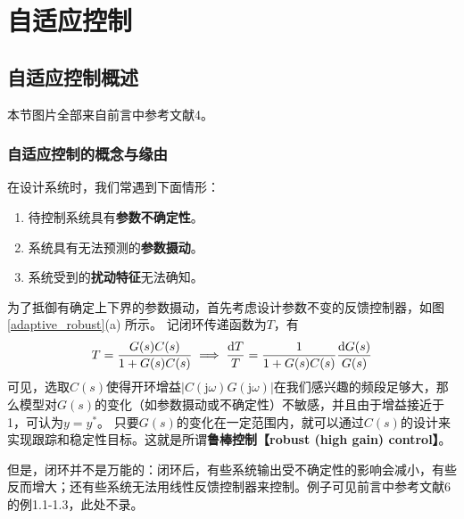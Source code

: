 \chapter{自适应控制}\label{cp4}
\section{自适应控制概述}\label{4Aref}
本节图片全部来自前言中参考文献4。
\subsection{自适应控制的概念与缘由}
在设计系统时，我们常遇到下面情形：
\begin{enumerate}
  \item 待控制系统具有{\textbf{参数不确定性}}。
  
  \item 系统具有无法预测的{\textbf{参数摄动}}。
  
  \item 系统受到的{\bf 扰动特征}无法确知。
\end{enumerate}

为了抵御有确定上下界的参数摄动，首先考虑设计参数不变的反馈控制器，如图 \ref{adaptive_robust}(a) 所示。
  记闭环传递函数为$T$，有\[T=\frac{G(s)C(s)}{1+G(s)C(s)}\implies \frac{\mathop{}\!\mathrm{d} T}{T}=\frac{1}{1+G(s)C(s)}\frac{\mathop{}\!\mathrm{d} G(s)}{G(s)}\]
  可见，选取$C(s)$使得开环增益$|C(\mathrm{j}\omega)G(\mathrm{j}\omega)|$在我们感兴趣的频段足够大，那么模型对$G(s)$的变化（如参数摄动或不确定性）不敏感，并且由于增益接近于1，可认为$y=y^\ast$。
  只要$G(s)$的变化在一定范围内，就可以通过$C(s)$的设计来实现跟踪和稳定性目标。这就是所谓{\bf 鲁棒控制【robust (high gain) control】}。

但是，闭环并不是万能的：闭环后，有些系统输出受不确定性的影响会减小，有些反而增大；还有些系统无法用线性反馈控制器来控制。例子可见前言中参考文献6的例1.1-1.3，此处不录。

